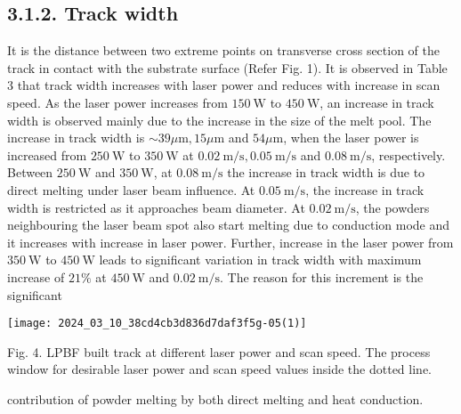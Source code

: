 \documentclass[10pt]{article}
\begin{document}
\subsection*{3.1.2. Track width}
It is the distance between two extreme points on transverse cross section of the track in contact with the substrate surface (Refer Fig. 1). It is observed in Table 3 that track width increases with laser power and reduces with increase in scan speed. As the laser power increases from $150 \mathrm{~W}$ to $450 \mathrm{~W}$, an increase in track width is observed mainly due to the increase in the size of the melt pool. The increase in track width is $\sim 39 \mu \mathrm{m}, 15 \mu \mathrm{m}$ and $54 \mu \mathrm{m}$, when the laser power is increased from $250 \mathrm{~W}$ to $350 \mathrm{~W}$ at $0.02 \mathrm{~m} / \mathrm{s}, 0.05 \mathrm{~m} / \mathrm{s}$ and $0.08 \mathrm{~m} / \mathrm{s}$, respectively. Between $250 \mathrm{~W}$ and $350 \mathrm{~W}$, at $0.08 \mathrm{~m} / \mathrm{s}$ the increase in track width is due to direct melting under laser beam influence. At $0.05 \mathrm{~m} / \mathrm{s}$, the increase in track width is restricted as it approaches beam diameter. At $0.02 \mathrm{~m} / \mathrm{s}$, the powders neighbouring the laser beam spot also start melting due to conduction mode and it increases with increase in laser power. Further, increase in the laser power from $350 \mathrm{~W}$ to $450 \mathrm{~W}$ leads to significant variation in track width with maximum increase of $21 \%$ at $450 \mathrm{~W}$ and $0.02 \mathrm{~m} / \mathrm{s}$. The reason for this increment is the significant

\begin{center}
\texttt{[image: 2024\_03\_10\_38cd4cb3d836d7daf3f5g-05(1)]}
\end{center}

Fig. 4. LPBF built track at different laser power and scan speed. The process window for desirable laser power and scan speed values inside the dotted line.

contribution of powder melting by both direct melting and heat conduction.
\end{document}

